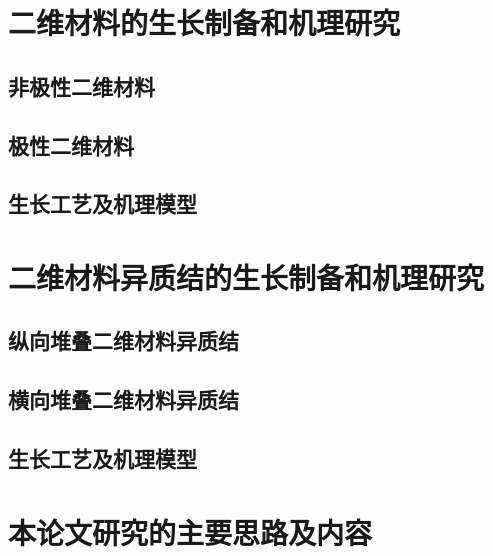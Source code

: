 

\section{二维材料的生长制备和机理研究}
\subsection{非极性二维材料}
\subsection{极性二维材料}
\subsection{生长工艺及机理模型}

\section{二维材料异质结的生长制备和机理研究}
\subsection{纵向堆叠二维材料异质结}
\subsection{横向堆叠二维材料异质结}
\subsection{生长工艺及机理模型}

\section{本论文研究的主要思路及内容}
